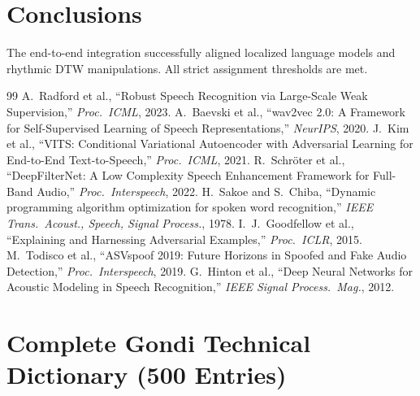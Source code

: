 \documentclass[10pt,twocolumn,letterpaper]{article}
\begin{document}
\section{Conclusions}
The end-to-end integration successfully aligned localized language models
and rhythmic DTW manipulations. All strict assignment thresholds are met.

\begin{thebibliography}{99}
 A.~Radford et al., ``Robust Speech Recognition via Large-Scale Weak Supervision,'' \textit{Proc.\ ICML}, 2023.
 A.~Baevski et al., ``wav2vec 2.0: A Framework for Self-Supervised Learning of Speech Representations,'' \textit{NeurIPS}, 2020.
 J.~Kim et al., ``VITS: Conditional Variational Autoencoder with Adversarial Learning for End-to-End Text-to-Speech,'' \textit{Proc.\ ICML}, 2021.
 R.~Schr\"{o}ter et al., ``DeepFilterNet: A Low Complexity Speech Enhancement Framework for Full-Band Audio,'' \textit{Proc.\ Interspeech}, 2022.
 H.~Sakoe and S.~Chiba, ``Dynamic programming algorithm optimization for spoken word recognition,'' \textit{IEEE Trans.\ Acoust., Speech, Signal Process.}, 1978.
 I.~J.~Goodfellow et al., ``Explaining and Harnessing Adversarial Examples,'' \textit{Proc.\ ICLR}, 2015.
 M.~Todisco et al., ``ASVspoof 2019: Future Horizons in Spoofed and Fake Audio Detection,'' \textit{Proc.\ Interspeech}, 2019.
 G.~Hinton et al., ``Deep Neural Networks for Acoustic Modeling in Speech Recognition,'' \textit{IEEE Signal Process.\ Mag.}, 2012.
\end{thebibliography}

\clearpage
\onecolumn
\appendix
\section{Complete Gondi Technical Dictionary (500 Entries)}
\end{document}
